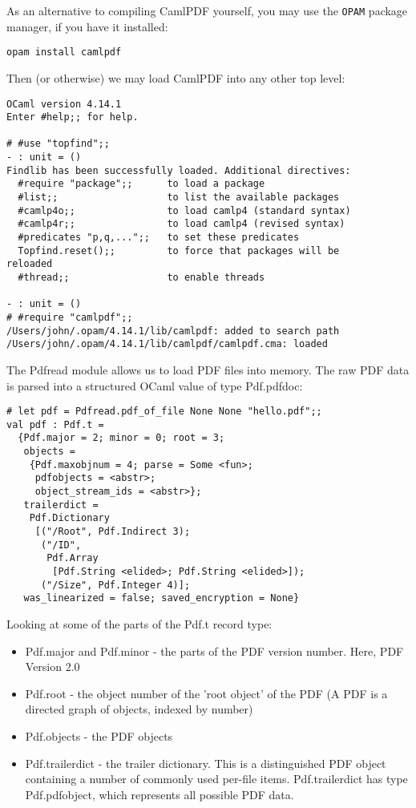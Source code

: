 \documentclass[a4paper]{memoir}
\begin{document}
\noindent As an alternative to compiling CamlPDF yourself, you may use the \texttt{OPAM} package manager, if you have it installed:
\begin{framed}
\verb!opam install camlpdf!
\end{framed}

\noindent Then (or otherwise) we may load CamlPDF into any other top level:

\begin{framed}
\begin{verbatim}
OCaml version 4.14.1
Enter #help;; for help.

# #use "topfind";;
- : unit = ()
Findlib has been successfully loaded. Additional directives:
  #require "package";;      to load a package
  #list;;                   to list the available packages
  #camlp4o;;                to load camlp4 (standard syntax)
  #camlp4r;;                to load camlp4 (revised syntax)
  #predicates "p,q,...";;   to set these predicates
  Topfind.reset();;         to force that packages will be
reloaded
  #thread;;                 to enable threads

- : unit = ()
# #require "camlpdf";;
/Users/john/.opam/4.14.1/lib/camlpdf: added to search path
/Users/john/.opam/4.14.1/lib/camlpdf/camlpdf.cma: loaded
\end{verbatim}
\end{framed}
\noindent The \textsf{Pdfread} module allows us to load PDF files into memory. The raw PDF data is parsed into a structured OCaml value of type \textsf{Pdf.pdfdoc}:
\begin{framed}
\begin{verbatim}
# let pdf = Pdfread.pdf_of_file None None "hello.pdf";;
val pdf : Pdf.t =
  {Pdf.major = 2; minor = 0; root = 3;
   objects =
    {Pdf.maxobjnum = 4; parse = Some <fun>;
     pdfobjects = <abstr>;
     object_stream_ids = <abstr>};
   trailerdict =
    Pdf.Dictionary
     [("/Root", Pdf.Indirect 3);
      ("/ID",
       Pdf.Array
        [Pdf.String <elided>; Pdf.String <elided>]);
      ("/Size", Pdf.Integer 4)];
   was_linearized = false; saved_encryption = None}
\end{verbatim}
\end{framed}
\noindent Looking at some of the parts of the \textsf{Pdf.t} record type:
\begin{itemize}
\item \textsf{Pdf.major} and \textsf{Pdf.minor} - the parts of the PDF version number. Here, PDF Version 2.0
\item \textsf{Pdf.root} - the object number of the 'root object' of the PDF (A PDF is a directed graph of objects, indexed by number)
\item \textsf{Pdf.objects} - the PDF objects
\item \textsf{Pdf.trailerdict} - the trailer dictionary. This is a distinguished PDF object containing a number of commonly used per-file items. \textsf{Pdf.trailerdict} has type \textsf{Pdf.pdfobject}, which represents all possible PDF data.
\end{itemize}
\end{document}
